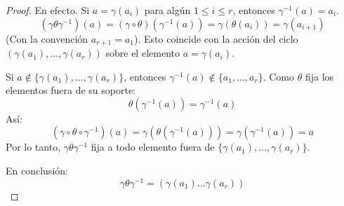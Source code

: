 
\begin{proof}
    En efecto.
    Si $a = \gamma(a_i)$ para algún $1 \leq i \leq r$, entonces $\gamma^{-1}(a) = a_i$.
    \begin{equation*}
        (\gamma \theta \gamma^{-1})(a) = (\gamma \circ \theta)(\gamma^{-1}(a)) = \gamma(\theta(a_i)) = \gamma(a_{i+1})
    \end{equation*}
    (Con la convención $a_{r+1} = a_1$).
    Esto coincide con la acción del ciclo $(\gamma(a_1), \dots, \gamma(a_r))$ sobre el elemento $a = \gamma(a_i)$.
    
    Si $a \notin \{\gamma(a_1), \dots, \gamma(a_r)\}$, entonces $\gamma^{-1}(a) \notin \{a_1, \dots, a_r\}$.
    Como $\theta$ fija los elementos fuera de su soporte:
    \begin{equation*}
        \theta(\gamma^{-1}(a)) = \gamma^{-1}(a)
    \end{equation*}
    Así:
    \begin{equation*}
        (\gamma \circ \theta \circ \gamma^{-1})(a) = \gamma(\theta(\gamma^{-1}(a))) = \gamma(\gamma^{-1}(a)) = a
    \end{equation*}
    Por lo tanto, $\gamma \theta \gamma^{-1}$ fija a todo elemento fuera de $\{\gamma(a_1), \dots, \gamma(a_r)\}$.
    
    En conclusión:
    \begin{equation*}
        \gamma \theta \gamma^{-1} = (\gamma(a_1) \dots \gamma(a_r))
    \end{equation*}
\end{proof}



